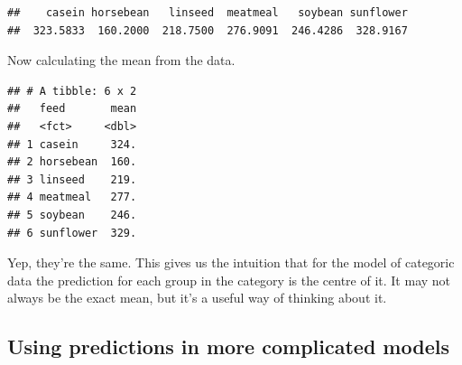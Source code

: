 \documentclass[
]{book}
\newenvironment{Shaded}{\begin{snugshade}}{\end{snugshade}}
\newcommand{\CommentTok}[1]{\textcolor[rgb]{0.56,0.35,0.01}{\textit{#1}}}
\newcommand{\DataTypeTok}[1]{\textcolor[rgb]{0.13,0.29,0.53}{#1}}
\newcommand{\KeywordTok}[1]{\textcolor[rgb]{0.13,0.29,0.53}{\textbf{#1}}}
\newcommand{\NormalTok}[1]{#1}
\newcommand{\OperatorTok}[1]{\textcolor[rgb]{0.81,0.36,0.00}{\textbf{#1}}}
\newcommand{\StringTok}[1]{\textcolor[rgb]{0.31,0.60,0.02}{#1}}
\begin{document}
\begin{Shaded}
\end{Shaded}

\begin{verbatim}
##    casein horsebean   linseed  meatmeal   soybean sunflower 
##  323.5833  160.2000  218.7500  276.9091  246.4286  328.9167
\end{verbatim}

Now calculating the mean from the data.

\begin{Shaded}
\end{Shaded}

\begin{verbatim}
## # A tibble: 6 x 2
##   feed       mean
##   <fct>     <dbl>
## 1 casein     324.
## 2 horsebean  160.
## 3 linseed    219.
## 4 meatmeal   277.
## 5 soybean    246.
## 6 sunflower  329.
\end{verbatim}

Yep, they're the same. This gives us the intuition that for the model of categoric data the prediction for each group in the category is the centre of it. It may not always be the exact mean, but it's a useful way of thinking about it.

\hypertarget{using-predictions-in-more-complicated-models}{%
\subsection{Using predictions in more complicated models}\label{using-predictions-in-more-complicated-models}}
\end{document}
